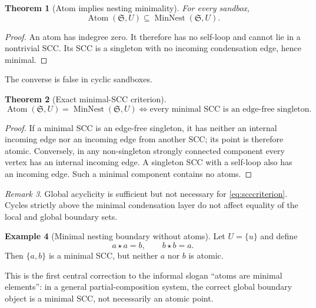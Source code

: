 \documentclass[11pt]{article}
\newtheorem{theorem}{Theorem}[section]
\theoremstyle{definition}
\newtheorem{example}[theorem]{Example}
\theoremstyle{remark}
\newtheorem{remark}[theorem]{Remark}
\newcommand{\Sbx}{\mathfrak S}
\newcommand{\Atom}{\operatorname{Atom}}
\newcommand{\MinNest}{\operatorname{MinNest}}
\begin{document}
\begin{theorem}[Atom implies nesting minimality]
For every sandbox,
\begin{equation}
\boxed{\Atom(\Sbx,U)\subseteq\MinNest(\Sbx,U).}
\label{eq:atommin}
\end{equation}
\end{theorem}

\begin{proof}
An atom has indegree zero. It therefore has no self-loop and cannot lie in a nontrivial SCC. Its SCC is a singleton with no incoming condensation edge, hence minimal.
\end{proof}

The converse is false in cyclic sandboxes.

\begin{theorem}[Exact minimal-SCC criterion]
\begin{equation}
\boxed{
\Atom(\Sbx,U)=\MinNest(\Sbx,U)
\iff
\text{every minimal SCC is an edge-free singleton}.}
\label{eq:scccriterion}
\end{equation}
\end{theorem}

\begin{proof}
If a minimal SCC is an edge-free singleton, it has neither an internal incoming edge nor an incoming edge from another SCC; its point is therefore atomic. Conversely, in any non-singleton strongly connected component every vertex has an internal incoming edge. A singleton SCC with a self-loop also has an incoming edge. Such a minimal component contains no atoms.
\end{proof}

\begin{remark}
Global acyclicity is sufficient but not necessary for \eqref{eq:scccriterion}. Cycles strictly above the minimal condensation layer do not affect equality of the local and global boundary sets.
\end{remark}

\begin{example}[Minimal nesting boundary without atoms]
Let \(U=\{u\}\) and define
\[
a\star a=b,\qquad b\star b=a.
\]
Then \(\{a,b\}\) is a minimal SCC, but neither \(a\) nor \(b\) is atomic.
\end{example}

This is the first central correction to the informal slogan ``atoms are minimal elements'': in a general partial-composition system, the correct global boundary object is a minimal SCC, not necessarily an atomic point.
\end{document}
